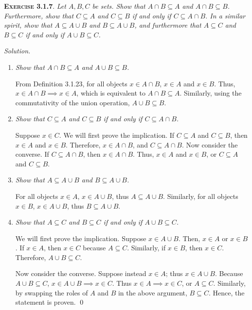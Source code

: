 \documentclass[12pt]{article}
\theoremstyle{remark}
\newenvironment{exer}[2]{
    \noindent \setlength{\parskip}{1em}%
    \textsc{\textbf{Exercise #1}}. \textit{#2} \par
    \noindent \textit{Solution.} %
}{\bigskip}
\begin{document}
\begin{exer}{3.1.7}{
    Let $A, B, C$ be sets.
    Show that $A \cap B \subseteq A$ and $A \cap B \subseteq B$.
    Furthermore, show that $C \subseteq A$ and $C\subseteq B$ if and only if $C \subseteq A \cap B$.
    In a similar spirit, show that $A \subseteq A \cup B$ and $B \subseteq A \cup B$,
    and furthermore that $A \subseteq C$ and $B \subseteq C$ if and only if $A \cup B \subseteq C$.
}
    \begin{enumerate}[topsep=0mm, label=(\alph*)]
        \item \textit{Show that $A \cap B \subseteq A$ and $A \cup B \subseteq B$.}
        
            From Definition 3.1.23, for all objects $x \in A \cap B$, $x \in A$ and $x \in B$.
            Thus, $x \in A \cap B \implies x \in A$, which is equivalent to $A \cap B \subseteq A$.
            Similarly, using the commutativity of the union operation, $A \cup B \subseteq B$.

        \item \textit{Show that $C \subseteq A$ and $C\subseteq B$ if and only if $C \subseteq A \cap B$.}
        
            Suppose $x \in C$.
            We will first prove the implication.
            If $C \subseteq A$ and $C \subseteq B$, then $x \in A$ and $x \in B$.
            Therefore, $x \in A \cap B$, and $C \subseteq A \cap B$.
            Now consider the converse.
            If $C \subseteq A \cap B$, then $x \in A \cap B$.
            Thus, $x \in A$ and $x \in B$, or $C \subseteq A$ and $C \subseteq B$.

        \item \textit{Show that $A \subseteq A \cup B$ and $B \subseteq A \cup B$.}

            For all objects $x \in A$, $x \in A \cup B$, thus $A \subseteq A \cup B$.
            Similarly, for all objects $x \in B$, $x \in A \cup B$, thus $B \subseteq A \cup B$.

        \item \textit{Show that $A \subseteq C$ and $B \subseteq C$ if and only if $A \cup B \subseteq C$.}

            We will first prove the implication.
            Suppose $x \in A \cup B$. Then, $x \in A$ or $x \in B$.
            If $x \in A$, then $x \in C$ because $A \subseteq C$.
            Similarly, if $x \in B$, then $x \in C$.
            Therefore, $A \cup B \subseteq C$.
            
            Now consider the converse.
            Suppose instead $x \in A$; thus $x \in A \cup B$.
            Because $A \cup B \subseteq C$, $x \in A \cup B \implies x \in C$.
            Thus $x \in A \implies x \in C$, or $A \subseteq C$.
            Similarly, by swapping the roles of $A$ and $B$ in the above argument, $B \subseteq C$.
            Hence, the statement is proven. \qed
            
    \end{enumerate}
\end{exer}
\end{document}

